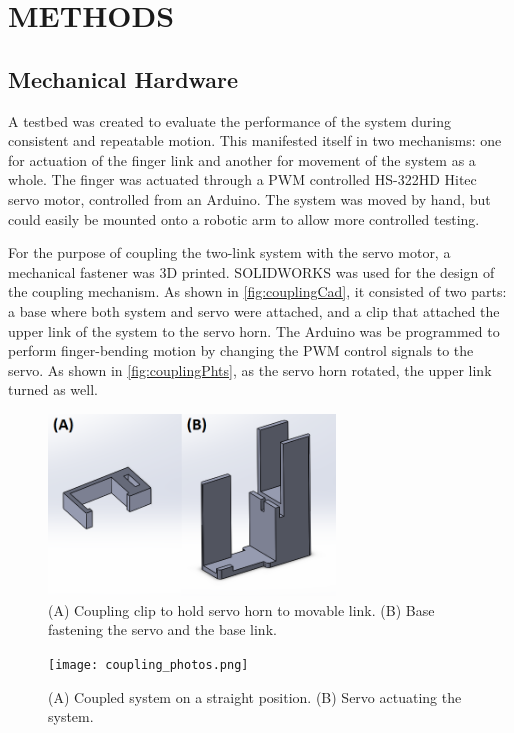 \documentclass[letterpaper, 10 pt, conference]{ieeeconf}  %
\begin{document}
\section{METHODS}

\subsection{Mechanical Hardware}
A testbed was created to evaluate the performance of the system during consistent and repeatable motion. This manifested itself in two mechanisms: one for actuation of the finger link and another for movement of the system as a whole. The finger was actuated through a PWM controlled HS-322HD Hitec servo motor, controlled from an Arduino. The system was moved by hand, but could easily be mounted onto a robotic arm to allow more controlled testing.

For the purpose of coupling the two-link system with the servo motor, a mechanical fastener was 3D printed. SOLIDWORKS was used for the design of the coupling mechanism. As shown in \autoref{fig:couplingCad}, it consisted of two parts: a base where both system and servo were attached, and a clip that attached the upper link of the system to the servo horn. The Arduino was be programmed to perform finger-bending motion by changing the PWM control signals to the servo. As shown in \autoref{fig:couplingPhts}, as the servo horn rotated, the upper link turned as well.

\begin{figure}[thpb]
	\centering
	\includegraphics[width = 3in]{coupling_cads.png}
    \caption{(A) Coupling clip to hold servo horn to movable link. (B) Base fastening the servo and the base link.}
    \label{fig:couplingCad}
\end{figure}

\begin{figure}[thpb]
	\centering
	\texttt{[image: coupling\_photos.png]}
    \caption{(A) Coupled system on a straight position. (B) Servo actuating the system.}
    \label{fig:couplingPhts}
\end{figure}
\end{document}
